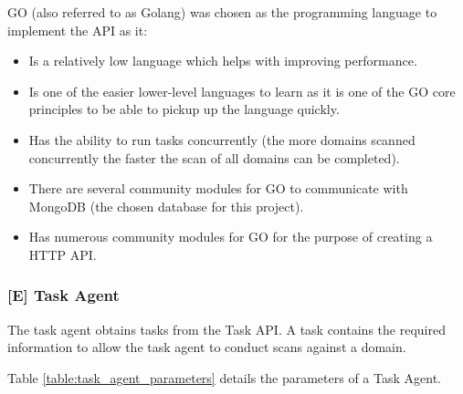 \documentclass{mscreport}
\begin{document}
\vspace{0.6cm} \noindent
GO (also referred to as Golang) was chosen as the programming language to implement the API as it:
\begin{itemize}
	\setlength\itemsep{0.1em}
    \item Is a relatively low language which helps with improving performance.
    \item Is one of the easier lower-level languages to learn as it is one of the GO core principles to be able to pickup up the language quickly.
    \item Has the ability to run tasks concurrently (the more domains scanned concurrently the faster the scan of all domains can be completed).
    \item There are several community modules for GO to communicate with MongoDB (the chosen database for this project).
    \item Has numerous community modules for GO for the purpose of creating a HTTP API.
\end{itemize}

\subsubsection{[E] Task Agent}

The task agent obtains tasks from the Task API. A task contains the required information to allow the task agent to conduct scans against a domain.

\vspace{0.6cm} \noindent
Table \ref{table:task_agent_parameters} details the parameters of a Task Agent.
\newpage
\end{document}

